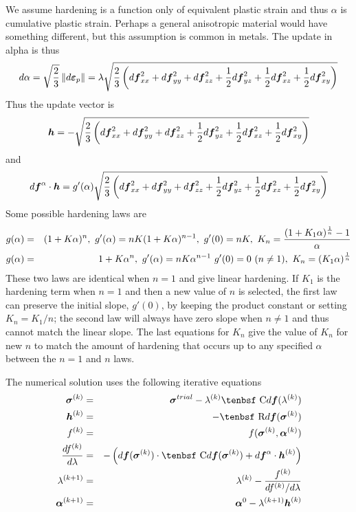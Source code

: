 \documentclass[11pt]{article}
\renewcommand{\vec}[1]{\boldsymbol{#1}}
\def\C{\hbox{\tenbsf C}}
\def\dpl{d \vec{\varepsilon}_{p}}
\def\df{d \vec{f}}
\def\dfa{d \vec{f}^\alpha}
\def\R{\hbox{\tenbsf R}}
\begin{document}
We assume hardening is a function only of equivalent plastic strain and thus $\alpha$ is cumulative plastic strain. Perhaps a general anisotropic material would have something different, but this assumption is common in metals. The update in alpha is thus
\begin{equation}
     d\alpha = \sqrt{2\over 3}\thinspace \| \dpl\| = \lambda \sqrt{{2\over 3}\left(\df_{xx}^2 + \df_{yy}^2 + \df_{zz}^2 + {1\over2}\df_{yz}^2+ {1\over2}\df_{xz}^2+ {1\over2}\df_{xy}^2\right)}
\end{equation}
Thus the update vector is
\begin{equation}
      \vec h = - \sqrt{{2\over 3}\left(\df_{xx}^2 + \df_{yy}^2 + \df_{zz}^2 + {1\over2}\df_{yz}^2+ {1\over2}\df_{xz}^2+ {1\over2}\df_{xy}^2\right)}
\end{equation}
and
\begin{equation}
   \dfa \cdot \vec h =  g'(\alpha)\sqrt{{2\over 3}\left(\df_{xx}^2 + \df_{yy}^2 + \df_{zz}^2 + {1\over2}\df_{yz}^2+ {1\over2}\df_{xz}^2 + {1\over2}\df_{xy}^2\right)}
\end{equation}
Some possible hardening laws are
\begin{eqnarray}
     g(\alpha)  & = & (1 + K\alpha)^n, \  g'(\alpha) =  nK(1+K\alpha)^{n-1}, \  g'(0)=nK, \  K_n={(1+K_1\alpha)^{1\over n} - 1\over \alpha}  \\
     g(\alpha)  & = & 1 + K\alpha^n, \  g'(\alpha) =  nK\alpha^{n-1} \  g'(0)=0\ (n\ne1), \ K_n = (K_1\alpha)^{1\over n}
\end{eqnarray}
These two laws are identical when $n=1$ and give linear hardening. If $K_1$ is the hardening term when $n=1$ and then a new value of $n$ is selected, the first law can preserve the initial slope, $g'(0)$, by keeping the product constant or setting $K_n = K_1/n$; the second law will always have zero slope when $n\ne1$ and thus cannot match the linear slope. The last equations for $K_n$ give the value of $K_n$ for new $n$ to match the amount of hardening that occurs up to any specified $\alpha$ between the $n=1$ and $n$ laws.

The numerical solution uses the following iterative equations
\begin{eqnarray}
       \vec\sigma^{(k)} & = & \vec\sigma^{trial} - \lambda^{(k)}\C\df(\lambda^{(k)}) \\
        \vec h^{(k)} & = & -\R\df(\vec\sigma^{(k)}) \\
        f^{(k)} & = &  f( \vec\sigma^{(k)},\vec\alpha^{(k)})  \\
        {df^{(k)}\over d\lambda} & = & -\left( \df(\vec\sigma^{(k)})\cdot \C\df(\vec\sigma^{(k)})  + \dfa \cdot \vec h^{(k)}\right) \\
        \lambda^{(k+1)} & = & \lambda^{(k)} - {f^{(k)} \over {df^{(k)}/ d\lambda} } \\
        \vec\alpha^{(k+1)} & = & \vec\alpha^{0} -  \lambda^{(k+1)} \vec h^{(k)}
\end{eqnarray}
\end{document}
